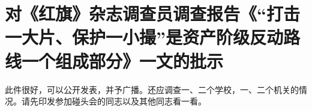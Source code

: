 \section[对《红旗》杂志调查员调查报告《“打击一大片、保护一小撮”是资产阶级反动路线一个组成部分》一文的批示（一九六七年三月二十九日）]{对《红旗》杂志调查员调查报告《“打击一大片、保护一小撮”是资产阶级反动路线一个组成部分》一文的批示}


此件很好，可以公开发表，并予广播。还应调查一、二个学校，一、二个机关的情况。请先印发参加碰头会的同志以及其他同志看一看。

